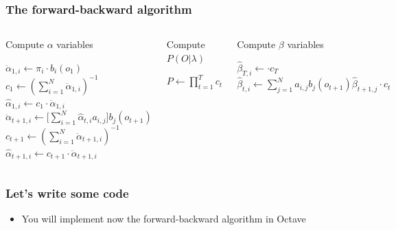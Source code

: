 \begin{frame}[fragile]
  \frametitle{The forward-backward algorithm} \vspace*{-1em}
  \begin{columns}[T]
    \begin{algorithm}[H]
      \scriptsize
      \caption{Compute $\alpha$ variables}
      \label{alg1}
       
      \begin{algorithmic}[2]
         \STATE $\ddot{\alpha}_{1,i} \leftarrow
        \pi_i \cdot b_i(o_1)$
        \ENDFOR
        \STATE $c_1 \leftarrow (\displaystyle\sum_{i=1}^{N}
        \ddot{\alpha}_{1,i})^{-1}$  \STATE
        $\hat{\alpha}_{1,i} \leftarrow c_1 \cdot \ddot{\alpha}_{1,i}$
        \ENDFOR
          \STATE
        $\ddot{\alpha}_{t+1,i} \leftarrow \Big[
        \displaystyle\sum_{i=1}^{N}\hat{\alpha}_{t,i}a_{i,j}\Big]
        b_{j}(o_{t+1})$
        \ENDFOR
        \STATE $c_{t+1} \leftarrow (\displaystyle\sum_{i=1}^{N}
        \ddot{\alpha}_{t+1,i})^{-1}$  \STATE
        $\hat{\alpha}_{t+1,i} \leftarrow c_{t+1} \cdot
        \ddot{\alpha}_{t+1,i}$
        \ENDFOR
        \ENDFOR
      
      \end{algorithmic}
    \end{algorithm}
    \begin{algorithm}[H]
      \scriptsize
      \caption{Compute $P(O \vert \lambda)$}
      \label{alg2}
       
      \begin{algorithmic}[2]
        \STATE $P \leftarrow \displaystyle\prod_{t=1}^{T}c_t$
      \end{algorithmic}
    \end{algorithm}
    \vspace*{1em}
    \begin{algorithm}[H]
      \scriptsize
      \caption{Compute $\beta$ variables}
      \label{alg3}
       
      \begin{algorithmic}[2]
         \STATE $\hat{\beta}_{T,i} \leftarrow \cdot
        c_T$
        \ENDFOR
          \STATE
        $\hat{\beta}_{t,i} \leftarrow \displaystyle\sum_{j=1}^{N}
        a_{i,j} b_{j}(o_{t+1}) \hat{\beta}_{t+1,j} \cdot c_t$
        \ENDFOR
        \ENDFOR
      \end{algorithmic}
    \end{algorithm}
  \end{columns}
\end{frame}

\begin{frame}
  \frametitle{Let's write some code}
  \begin{itemize}
  \item You will implement now the forward-backward algorithm in
    Octave

  \end{itemize}

\end{frame}
